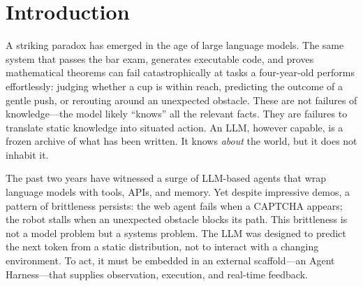 \section{Introduction}

A striking paradox has emerged in the age of large language models. The same system that passes the bar exam, generates executable code, and proves mathematical theorems can fail catastrophically at tasks a four-year-old performs effortlessly: judging whether a cup is within reach, predicting the outcome of a gentle push, or rerouting around an unexpected obstacle. These are not failures of knowledge---the model likely ``knows'' all the relevant facts. They are failures to translate static knowledge into situated action. An LLM, however capable, is a frozen archive of what has been written. It knows \emph{about} the world, but it does not inhabit it.

The past two years have witnessed a surge of LLM-based agents that wrap language models with tools, APIs, and memory. Yet despite impressive demos, a pattern of brittleness persists: the web agent fails when a CAPTCHA appears; the robot stalls when an unexpected obstacle blocks its path. This brittleness is not a model problem but a systems problem. The LLM was designed to predict the next token from a static distribution, not to interact with a changing environment. To act, it must be embedded in an external scaffold---an Agent Harness---that supplies observation, execution, and real-time feedback.

